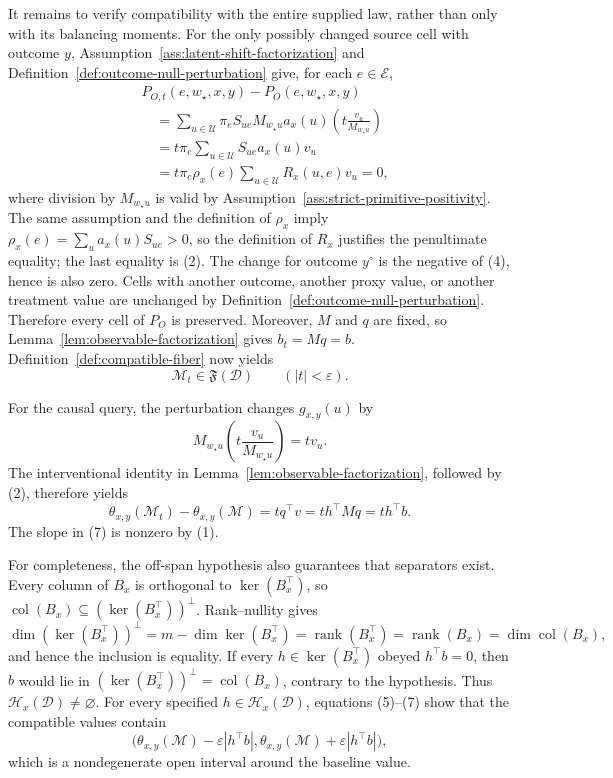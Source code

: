 It remains to verify compatibility with the entire supplied law, rather than only with its balancing moments. For the only possibly changed source cell with outcome \(y\), Assumption~\ref{ass:latent-shift-factorization} and Definition~\ref{def:outcome-null-perturbation} give, for each \(e\in\mathcal E\),
\[
\begin{aligned}
&P_{O,t}(e,w_{\star},x,y)-P_O(e,w_{\star},x,y)\\
&\quad=\sum_{u\in\mathcal U}\pi_eS_{ue}M_{w_{\star}u}a_x(u)
\left(t\frac{v_u}{M_{w_{\star}u}}\right)\\
&\quad=t\pi_e\sum_{u\in\mathcal U}S_{ue}a_x(u)v_u\\
&\quad=t\pi_e\rho_x(e)\sum_{u\in\mathcal U}R_x(u,e)v_u
=0,
\end{aligned}
\tag{4}
\]
where division by \(M_{w_{\star}u}\) is valid by Assumption~\ref{ass:strict-primitive-positivity}. The same assumption and the definition of \(\rho_x\) imply \(\rho_x(e)=\sum_u a_x(u)S_{ue}>0\), so the definition of \(R_x\) justifies the penultimate equality; the last equality is (2). The change for outcome \(y^{\circ}\) is the negative of (4), hence is also zero. Cells with another outcome, another proxy value, or another treatment value are unchanged by Definition~\ref{def:outcome-null-perturbation}. Therefore every cell of \(P_O\) is preserved. Moreover, \(M\) and \(q\) are fixed, so Lemma~\ref{lem:observable-factorization} gives \(b_t=Mq=b\). Definition~\ref{def:compatible-fiber} now yields
\[
\mathcal M_t\in\mathfrak F(\mathcal D)
\qquad (|t|<\varepsilon).
\tag{5}
\]

For the causal query, the perturbation changes \(g_{x,y}(u)\) by
\[
M_{w_{\star}u}\left(t\frac{v_u}{M_{w_{\star}u}}\right)=tv_u.
\tag{6}
\]
The interventional identity in Lemma~\ref{lem:observable-factorization}, followed by (2), therefore yields
\[
\theta_{x,y}(\mathcal M_t)-\theta_{x,y}(\mathcal M)
=tq^{\top}v
=t h^{\top}Mq
=t h^{\top}b.
\tag{7}
\]
The slope in (7) is nonzero by (1).

For completeness, the off-span hypothesis also guarantees that separators exist. Every column of \(B_x\) is orthogonal to \(\ker(B_x^{\top})\), so \(\operatorname{col}(B_x)\subseteq(\ker(B_x^{\top}))^{\perp}\). Rank--nullity gives
\[
\dim (\ker(B_x^{\top}))^{\perp}
=m-\dim\ker(B_x^{\top})
=\operatorname{rank}(B_x^{\top})
=\operatorname{rank}(B_x)
=\dim\operatorname{col}(B_x),
\]
and hence the inclusion is equality. If every \(h\in\ker(B_x^{\top})\) obeyed \(h^{\top}b=0\), then \(b\) would lie in \((\ker(B_x^{\top}))^{\perp}=\operatorname{col}(B_x)\), contrary to the hypothesis. Thus \(\mathcal H_x(\mathcal D)\ne\varnothing\). For every specified \(h\in\mathcal H_x(\mathcal D)\), equations (5)--(7) show that the compatible values contain
\[
\bigl(\theta_{x,y}(\mathcal M)-\varepsilon|h^{\top}b|,
      \theta_{x,y}(\mathcal M)+\varepsilon|h^{\top}b|\bigr),
\tag{8}
\]
which is a nondegenerate open interval around the baseline value.

